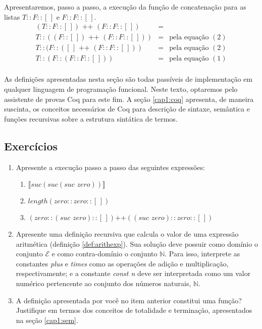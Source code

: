 \begin{Example}
Apresentaremos, passo a passo, a execu\c{c}\~ao da fun\c{c}\~ao de concatena\c{c}\~ao para as listas $T :: F :: [\,]$ e $F :: F :: [\,]$.
\[
\begin{array}{lcl}
(T :: F :: [\,]) \text{ ++ } (F :: F ::[\,]) & = & \\
T :: ((F :: [\,]) \text{ ++ } (F :: F ::[\,])) & = & \text{pela equa\c{c}\~ao }(2)\\
T :: (F :: ([\,] \text{ ++ } (F :: F ::[\,])) & = & \text{pela equa\c{c}\~ao }(2)\\
T :: (F :: (F :: F ::[\,])) & = & \text{pela equa\c{c}\~ao }(1)\\
\end{array}
\]
\end{Example}

As defini\c{c}\~oes apresentadas nesta se\c{c}\~ao s\~ao todas pass\'iveis de implementa\c{c}\~ao em qualquer linguagem de programa\c{c}\~ao
funcional. Neste texto, optaremos pelo assistente de provas Coq para este fim. A se\c{c}\~ao \ref{cap1:coq} apresenta, de maneira suscinta, 
os conceitos necess\'arios de Coq para descri\c{c}\~ao de sintaxe, sem\^antica e fun\c{c}\~oes recursivas sobre a estrutura sint\'atica de termos.

\subsection{Exerc\'icios}

\begin{enumerate}
  \item Apresente a execu\c{c}\~ao passo a passo das seguintes express\~oes:
  \begin{enumerate}
    \item $\llbracket suc (suc (suc\,\,zero))\rrbracket$ 
    \item $length (zero :: zero :: [\,])$
    \item $(zero :: (suc\,\, zero) ::[\,])\text{++}((suc\,\,zero) :: zero :: [\,])$
  \end{enumerate}
  \item Apresente uma defini\c{c}\~ao recursiva que calcula o valor de uma express\~ao aritm\'etica (defini\c{c}\~ao \ref{def:arithexp}).
        Sua solu\c{c}\~ao deve possuir como dom\'inio o conjunto $\mathcal{E}$ e como contra-dom\'inio o conjunto $\mathbb{N}$. Para isso, 
        interprete as constantes \textit{plus} e \textit{times} como as opera\c{c}\~oes de adi\c{c}\~ao e multiplica\c{c}\~ao, respectivamente; e
        a constante \textit{const n} deve ser interpretada como um valor num\'erico pertencente ao conjunto dos n\'umeros naturais, $\mathbb{N}$.
  \item A defini\c{c}\~ao apresentada por voc\^e no item anterior constitui uma fun\c{c}\~ao? Justifique em termos dos conceitos de totalidade
        e termina\c{c}\~ao, apresentados na se\c{c}\~ao \ref{cap1:sem}.
\end{enumerate}

